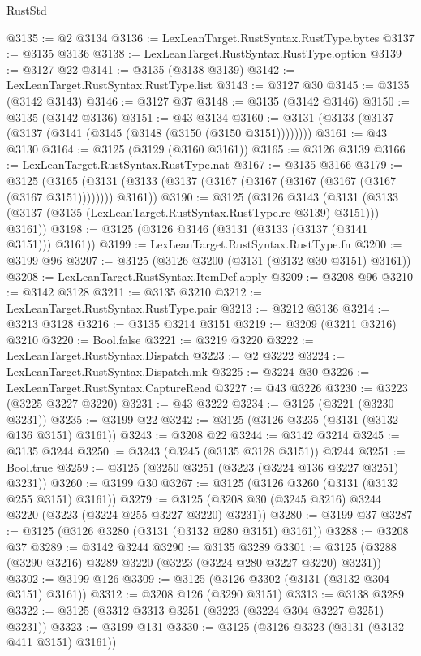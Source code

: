 \begin{lexlean}{RustStd}
\begin{coremodule}
{\begin{coremodule}
{{{{{{{{{{{{{{{{{{{{{{{{{{{{{{{{{{{{{{{{{{{{{@3135 := @2 @3134
@3136 := LexLeanTarget.RustSyntax.RustType.bytes
@3137 := @3135 @3136
@3138 := LexLeanTarget.RustSyntax.RustType.option
@3139 := @3127 @22
@3141 := @3135 (@3138 @3139)
@3142 := LexLeanTarget.RustSyntax.RustType.list
@3143 := @3127 @30
@3145 := @3135 (@3142 @3143)
@3146 := @3127 @37
@3148 := @3135 (@3142 @3146)
@3150 := @3135 (@3142 @3136)
@3151 := @43 @3134
@3160 := @3131 (@3133 (@3137 (@3137 (@3141 (@3145 (@3148 (@3150 (@3150 @3151))))))))
@3161 := @43 @3130
@3164 := @3125 (@3129 (@3160 @3161))
@3165 := @3126 @3139
@3166 := LexLeanTarget.RustSyntax.RustType.nat
@3167 := @3135 @3166
@3179 := @3125
    (@3165 (@3131 (@3133 (@3137 (@3167 (@3167 (@3167 (@3167 (@3167 (@3167 @3151)))))))) @3161))
@3190 := @3125
    (@3126
      @3143
      (@3131 (@3133 (@3137 (@3135 (LexLeanTarget.RustSyntax.RustType.rc @3139) @3151))) @3161))
@3198 := @3125 (@3126 @3146 (@3131 (@3133 (@3137 (@3141 @3151))) @3161))
@3199 := LexLeanTarget.RustSyntax.RustType.fn
@3200 := @3199 @96
@3207 := @3125 (@3126 @3200 (@3131 (@3132 @30 @3151) @3161))
@3208 := LexLeanTarget.RustSyntax.ItemDef.apply
@3209 := @3208 @96
@3210 := @3142 @3128
@3211 := @3135 @3210
@3212 := LexLeanTarget.RustSyntax.RustType.pair
@3213 := @3212 @3136
@3214 := @3213 @3128
@3216 := @3135 @3214 @3151
@3219 := @3209 (@3211 @3216) @3210
@3220 := Bool.false
@3221 := @3219 @3220
@3222 := LexLeanTarget.RustSyntax.Dispatch
@3223 := @2 @3222
@3224 := LexLeanTarget.RustSyntax.Dispatch.mk
@3225 := @3224 @30
@3226 := LexLeanTarget.RustSyntax.CaptureRead
@3227 := @43 @3226
@3230 := @3223 (@3225 @3227 @3220)
@3231 := @43 @3222
@3234 := @3125 (@3221 (@3230 @3231))
@3235 := @3199 @22
@3242 := @3125 (@3126 @3235 (@3131 (@3132 @136 @3151) @3161))
@3243 := @3208 @22
@3244 := @3142 @3214
@3245 := @3135 @3244
@3250 := @3243 (@3245 (@3135 @3128 @3151)) @3244
@3251 := Bool.true
@3259 := @3125 (@3250 @3251 (@3223 (@3224 @136 @3227 @3251) @3231))
@3260 := @3199 @30
@3267 := @3125 (@3126 @3260 (@3131 (@3132 @255 @3151) @3161))
@3279 := @3125 (@3208 @30 (@3245 @3216) @3244 @3220 (@3223 (@3224 @255 @3227 @3220) @3231))
@3280 := @3199 @37
@3287 := @3125 (@3126 @3280 (@3131 (@3132 @280 @3151) @3161))
@3288 := @3208 @37
@3289 := @3142 @3244
@3290 := @3135 @3289
@3301 := @3125 (@3288 (@3290 @3216) @3289 @3220 (@3223 (@3224 @280 @3227 @3220) @3231))
@3302 := @3199 @126
@3309 := @3125 (@3126 @3302 (@3131 (@3132 @304 @3151) @3161))
@3312 := @3208 @126 (@3290 @3151)
@3313 := @3138 @3289
@3322 := @3125 (@3312 @3313 @3251 (@3223 (@3224 @304 @3227 @3251) @3231))
@3323 := @3199 @131
@3330 := @3125 (@3126 @3323 (@3131 (@3132 @411 @3151) @3161))
}}}}}}}}}}}}}}}}}}}}}}}}}}}}}}}}}}}}}}}}}}}}}
\end{coremodule}}
\end{coremodule}
\end{lexlean}
